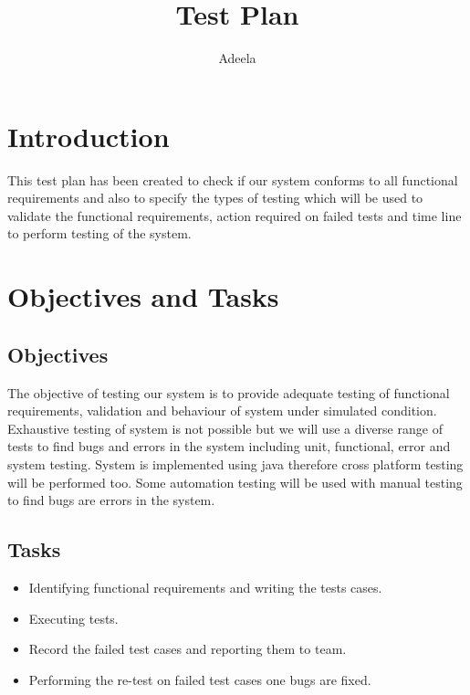 \documentclass[11pt, oneside]{article}   	%
\title{Test Plan}
\author{Adeela}
\begin{document}
\maketitle
\section{Introduction}
This test plan has been created to check if our system conforms to all functional requirements and also to specify the types of testing which will be used to validate the functional requirements, action required on failed tests and time line to perform testing of the system.
\section{Objectives and Tasks}
\subsection{Objectives}
The objective of testing our system is to provide adequate testing of functional requirements, validation and behaviour of system under simulated condition. Exhaustive testing of system is not possible but we will use a diverse range of tests to find bugs and errors in the system including unit, functional, error and system testing. System is implemented using java therefore cross platform testing will be performed too. Some automation testing will be used with manual testing to find bugs are errors in the system.
\subsection{Tasks}
\begin{itemize}
\item Identifying functional requirements and writing the tests cases.
\item Executing tests.
\item Record the failed test cases and reporting them to team.
\item Performing the re-test on failed test cases one bugs are fixed.
\end{itemize}
\end{document}
